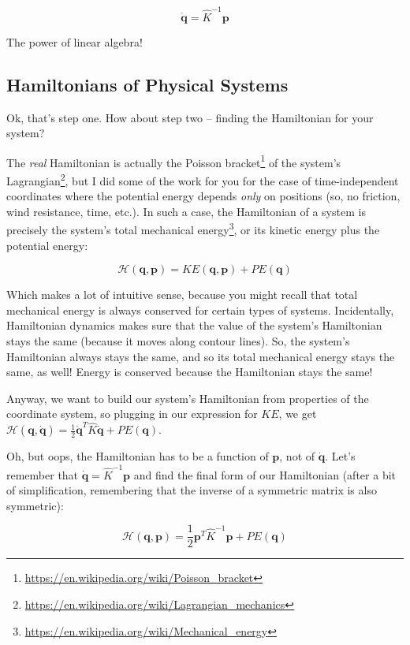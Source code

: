 \documentclass[]{article}
\renewcommand{\href}[2]{#2\footnote{\url{#1}}}
\begin{document}
\[
\dot{\mathbf{q}} = \hat{K}^{-1} \mathbf{p}
\]

The power of linear algebra!

\subsection{Hamiltonians of Physical
Systems}\label{hamiltonians-of-physical-systems}

Ok, that's step one. How about step two -- finding the Hamiltonian for your
system?

The \emph{real} Hamiltonian is actually the
\href{https://en.wikipedia.org/wiki/Poisson_bracket}{Poisson bracket} of the
system's \href{https://en.wikipedia.org/wiki/Lagrangian_mechanics}{Lagrangian},
but I did some of the work for you for the case of time-independent coordinates
where the potential energy depends \emph{only} on positions (so, no friction,
wind resistance, time, etc.). In such a case, the Hamiltonian of a system is
precisely the system's total
\href{https://en.wikipedia.org/wiki/Mechanical_energy}{mechanical energy}, or
its kinetic energy plus the potential energy:

\[
\mathcal{H}(\mathbf{q},\mathbf{p}) = KE(\mathbf{q},\mathbf{p}) + PE(\mathbf{q})
\]

Which makes a lot of intuitive sense, because you might recall that total
mechanical energy is always conserved for certain types of systems.
Incidentally, Hamiltonian dynamics makes sure that the value of the system's
Hamiltonian stays the same (because it moves along contour lines). So, the
system's Hamiltonian always stays the same, and so its total mechanical energy
stays the same, as well! Energy is conserved because the Hamiltonian stays the
same!

Anyway, we want to build our system's Hamiltonian from properties of the
coordinate system, so plugging in our expression for \(KE\), we get
\(\mathcal{H}(\mathbf{q},\dot{\mathbf{q}}) = \frac{1}{2} \dot{\mathbf{q}}^T \hat{K} \dot{\mathbf{q}} + PE(\mathbf{q})\).

Oh, but oops, the Hamiltonian has to be a function of \(\mathbf{p}\), not of
\(\dot{\mathbf{q}}\). Let's remember that
\(\dot{\mathbf{q}} = \hat{K}^{-1} \mathbf{p}\) and find the final form of our
Hamiltonian (after a bit of simplification, remembering that the inverse of a
symmetric matrix is also symmetric):

\[
\mathcal{H}(\mathbf{q},\mathbf{p}) = \frac{1}{2} \mathbf{p}^T \hat{K}^{-1} \mathbf{p} + PE(\mathbf{q})
\]
\end{document}
